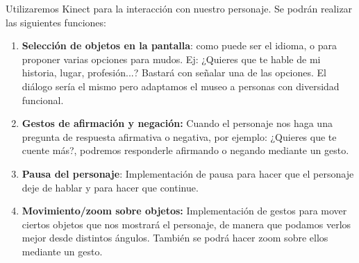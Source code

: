 \documentclass{article}
\begin{document}
Utilizaremos Kinect para la interacción con nuestro personaje. Se podrán realizar las siguientes funciones:
\begin{enumerate}
	\item \textbf{Selección de objetos en la pantalla}: como puede ser el idioma, o para proponer varias opciones para mudos. Ej: ¿Quieres que te hable de mi historia, lugar, profesión...? Bastará con señalar una de las opciones. El diálogo sería el mismo pero adaptamos el museo a personas con diversidad funcional.

	\item \textbf{Gestos de afirmación y negación:} Cuando el personaje nos haga una pregunta de respuesta afirmativa o negativa, por ejemplo: ¿Quieres que te cuente más?, podremos responderle afirmando o negando mediante un gesto.

	\item \textbf{Pausa del personaje}: Implementación de pausa para hacer que el personaje deje de hablar y para hacer que continue.
	
	\item \textbf{Movimiento/zoom sobre objetos:} Implementación de gestos para mover ciertos objetos que nos mostrará el personaje, de manera que podamos verlos mejor desde distintos ángulos. También se podrá hacer zoom sobre ellos mediante un gesto.
\end{enumerate}


	
\end{document}

